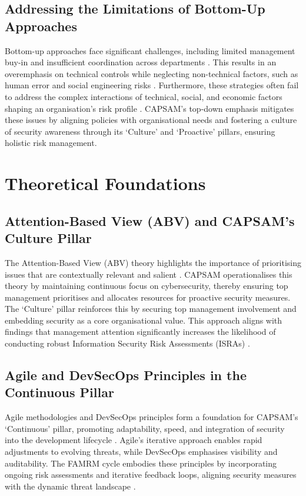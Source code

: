     \subsection{Addressing the Limitations of Bottom-Up Approaches}
    Bottom-up approaches face significant challenges, including limited management buy-in and insufficient coordination across departments \citep{shaikh2023information}. This results in an overemphasis on technical controls while neglecting non-technical factors, such as human error and social engineering risks \citep{shedden2010information}. Furthermore, these strategies often fail to address the complex interactions of technical, social, and economic factors shaping an organisation's risk profile \citep{cai2017cybersecurity}. CAPSAM's top-down emphasis mitigates these issues by aligning policies with organisational needs and fostering a culture of security awareness through its `Culture' and `Proactive' pillars, ensuring holistic risk management.
    
\section{Theoretical Foundations}    
    \subsection{Attention-Based View (ABV) and CAPSAM's Culture Pillar}
    The Attention-Based View (ABV) theory highlights the importance of prioritising issues that are contextually relevant and salient \citep{shaikh2023information}. CAPSAM operationalises this theory by maintaining continuous focus on cybersecurity, thereby ensuring top management prioritises and allocates resources for proactive security measures. The `Culture' pillar reinforces this by securing top management involvement and embedding security as a core organisational value. This approach aligns with findings that management attention significantly increases the likelihood of conducting robust Information Security Risk Assessments (ISRAs) \citep{shaikh2023information}.
    
    \subsection{Agile and DevSecOps Principles in the Continuous Pillar}
    Agile methodologies and DevSecOps principles form a foundation for CAPSAM's `Continuous' pillar, promoting adaptability, speed, and integration of security into the development lifecycle \citep{ibm2021devsecops, dingsoyr2012agile}. Agile's iterative approach enables rapid adjustments to evolving threats, while DevSecOps emphasises visibility and auditability. The FAMRM cycle embodies these principles by incorporating ongoing risk assessments and iterative feedback loops, aligning security measures with the dynamic threat landscape \citep{ibm2021devsecops}.
    
